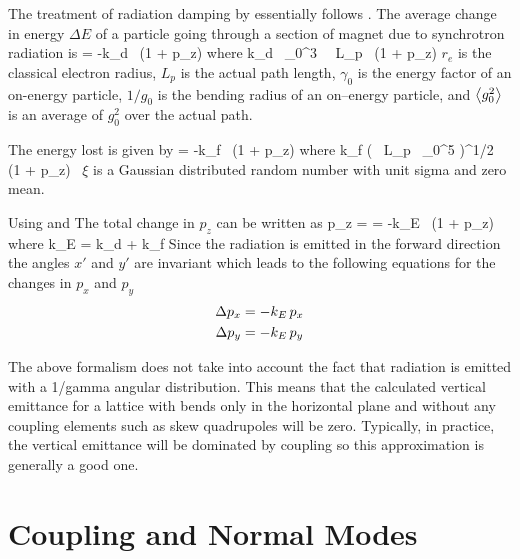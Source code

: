 The treatment of radiation damping by \bmad essentially follows \mad.
The average change in energy $\Delta E$ of a particle going through a
section of magnet due to synchrotron radiation is
\Begineq
   = -k_d \, (1 + p_z)
\Endeq
where
\Begineq
  k_d \equiv {} \, \gamma_0^3 \,  \, L_p \,  
  (1 + p_z)
  \label{k2r3g}
\Endeq
$r_e$ is the classical electron radius, $L_p$ is the actual path
length, $\gamma_0$ is the energy factor of an on-energy particle, $1/g_0$
is the bending radius of an on--energy particle, and $\left\langle g_0^2 \right\rangle$ is an
average of $g_0^2$ over the actual path.

The energy lost is given by
\Begineq
   = -k_f \, (1 + p_z)
\Endeq
where
\Begineq
  k_f \equiv \left(  \, 
  L_p \, \gamma_0^5  \right)^{1/2} \, (1 + p_z) \, \xi
  \label{k55rh}
\Endeq
$\xi$ is a Gaussian distributed random number with unit sigma and zero mean.

Using  and  The total change in $p_z$ can be written as
\Begineq
  \Delta p_z =  = -k_E \, (1 + p_z)
\Endeq
where
\Begineq
  k_E = k_d + k_f
\Endeq
Since the radiation is emitted in the forward direction the angles
$x'$ and $y'$ are invariant which leads to the following equations for
the changes in $p_x$ and $p_y$
\begin{align}
  \Delta p_x &= -k_E \, p_x \nonumber \\
  \Delta p_y &= -k_E \, p_y 
\end{align}

The above formalism does not take into account the fact that radiation is 
emitted with a 1/gamma angular distribution. This means that the calculated
vertical emittance for a lattice with
bends only in the horizontal plane and without any coupling elements such as
skew quadrupoles will be zero. Typically, in practice, the vertical emittance
will be dominated by coupling so this approximation is generally a good one.

\section{Coupling and Normal Modes}
\label{s:coupling}

